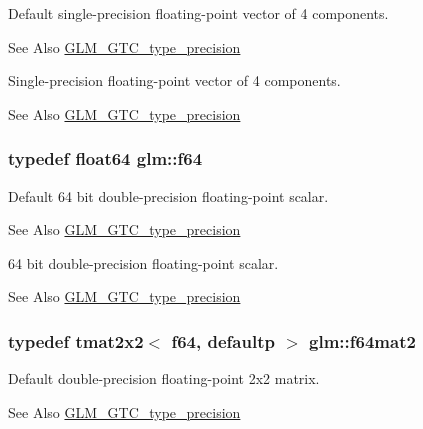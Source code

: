Default single-\/precision floating-\/point vector of 4 components. \begin{DoxySeeAlso}{See Also}
\hyperlink{group__gtc__type__precision}{G\-L\-M\-\_\-\-G\-T\-C\-\_\-type\-\_\-precision}
\end{DoxySeeAlso}
Single-\/precision floating-\/point vector of 4 components. \begin{DoxySeeAlso}{See Also}
\hyperlink{group__gtc__type__precision}{G\-L\-M\-\_\-\-G\-T\-C\-\_\-type\-\_\-precision} 
\end{DoxySeeAlso}
\hypertarget{group__gtc__type__precision_ga2bba392e555124b36cde6abba349bab3}{
\subsubsection[{f64}]{\setlength{\rightskip}{0pt plus 5cm}typedef float64 {\bf glm\-::f64}}}\label{group__gtc__type__precision_ga2bba392e555124b36cde6abba349bab3}
Default 64 bit double-\/precision floating-\/point scalar. \begin{DoxySeeAlso}{See Also}
\hyperlink{group__gtc__type__precision}{G\-L\-M\-\_\-\-G\-T\-C\-\_\-type\-\_\-precision}
\end{DoxySeeAlso}
64 bit double-\/precision floating-\/point scalar. \begin{DoxySeeAlso}{See Also}
\hyperlink{group__gtc__type__precision}{G\-L\-M\-\_\-\-G\-T\-C\-\_\-type\-\_\-precision} 
\end{DoxySeeAlso}
\hypertarget{group__gtc__type__precision_gaf66aa8b74ef627da80162c17a74a04fe}{
\subsubsection[{f64mat2}]{\setlength{\rightskip}{0pt plus 5cm}typedef tmat2x2$<$ f64, defaultp $>$ {\bf glm\-::f64mat2}}}\label{group__gtc__type__precision_gaf66aa8b74ef627da80162c17a74a04fe}
Default double-\/precision floating-\/point 2x2 matrix. \begin{DoxySeeAlso}{See Also}
\hyperlink{group__gtc__type__precision}{G\-L\-M\-\_\-\-G\-T\-C\-\_\-type\-\_\-precision}
\end{DoxySeeAlso}
